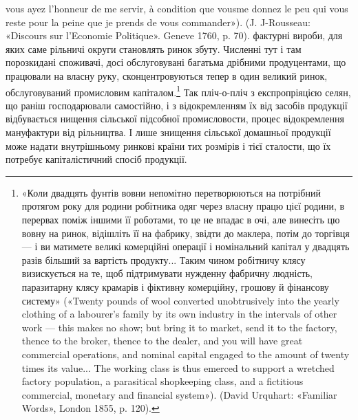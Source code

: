 vous ayez l’honneur de me servir, à condition que vousme donnez le peu
qui vous reste pour la peine que je prends de vous commander»). (J. J-Rousseau:
«Discours sur l’Economie Politique». Geneve 1760, p. 70).
фактурні вироби, для яких саме рільничі округи становлять
ринок збуту. Численні тут і там порозкидані споживачі, досі
обслуговувані багатьма дрібними продуцентами, що працювали
на власну руку, сконцентровуються тепер в один великий ринок,
обслуговуваний промисловим капіталом.\footnote{
«Коли двадцять фунтів вовни непомітно перетворюються на потрібний
протягом року для родини робітника одяг через власну працю
цієї родини, в перервах поміж іншими її роботами, то це не впадає в очі,
але винесіть цю вовну на ринок, відішліть її на фабрику, звідти до маклера,
потім до торгівця — і ви матимете великі комерційні операції і
номінальний капітал у двадцять разів більший за вартість продукту...
Таким чином робітничу клясу визискується на те, щоб підтримувати
нужденну фабричну людність, паразитарну клясу крамарів і фіктивну
комерційну, грошову й фінансову систему» («Twenty pounds of wool
converted unobtrusively into the yearly clothing of a labourer’s family
by its own industry in the intervals of other work — this makes no show;
but bring it to market, send it to the factory, thence to the broker, thence
to the dealer, and you will have great commercial operations, and nominal
capital engaged to the amount of twenty times its value... The working
class is thus emerced to support a wretched factory population, a parasitical
shopkeeping class, and a fictitious commercial, monetary and financial
system»). (David Urquhart: «Familiar Words», London 1855, p. 120).
} Так пліч-о-пліч
з експропріяцією селян, що раніш господарювали самостійно, і
з відокремленням їх від засобів продукції відбувається нищення
сільської підсобної промисловости, процес відокремлення мануфактури
від рільництва. І лише знищення сільської домашньої
продукції може надати внутрішньому ринкові країни тих розмірів
і тієї сталости, що їх потребує капіталістичний спосіб продукції.


